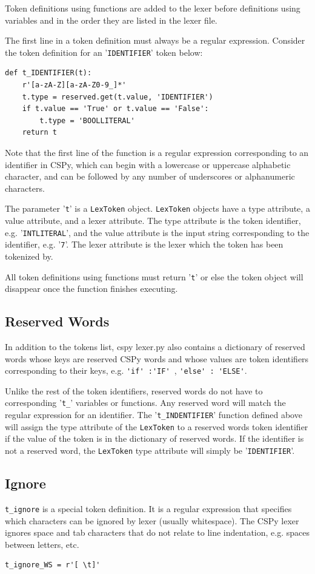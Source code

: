 \documentclass{article}
\begin{document}
Token definitions using functions are added to the lexer before definitions using variables and in the order they are listed in the lexer file. 

The first line in a token definition must always be a regular expression. Consider the token definition for an '\verb|IDENTIFIER|' token below:
\begin{verbatim}
def t_IDENTIFIER(t):
    r'[a-zA-Z][a-zA-Z0-9_]*'
    t.type = reserved.get(t.value, 'IDENTIFIER')
    if t.value == 'True' or t.value == 'False':
        t.type = 'BOOLLITERAL'
    return t
\end{verbatim}
Note that the first line of the function is a regular expression corresponding to an identifier in CSPy, which can begin with a lowercase or uppercase alphabetic character, and can be followed by any number of underscores or alphanumeric characters. 

The parameter '\verb|t|' is a \verb|LexToken| object. \verb|LexToken| objects have a type attribute, a value attribute, and a lexer attribute. The type attribute is the token identifier, e.g. '\verb|INTLITERAL|', and the value attribute is the input string corresponding to the identifier, e.g. '\verb|7|'. The lexer attribute is the lexer which the token has been tokenized by. 

All token definitions using functions must return '\verb|t|' or else the token object will disappear once the function finishes executing.

\subsection{Reserved Words}
In addition to the tokens list, cspy lexer.py also contains a dictionary of reserved words whose keys are reserved CSPy words and whose values are token identifiers corresponding to their keys, e.g. \verb|'if' :'IF' |, \verb|'else' : 'ELSE'|.

Unlike the rest of the token identifiers, reserved words do not have to corresponding '\verb|t_|' variables or functions. Any reserved word will match the regular expression for an identifier. The '\verb|t_INDENTIFIER|' function defined above will assign the type attribute of the \verb|LexToken| to a reserved words token identifier if the value of the token is in the dictionary of reserved words. If the identifier is not a reserved word, the \verb|LexToken| type attribute will simply be '\verb|IDENTIFIER|'.

\subsection{Ignore}
\verb|t_ignore| is a special token definition. It is a regular expression that specifies which characters can be ignored by lexer (usually whitespace). The CSPy lexer ignores space and tab characters that do not relate to line indentation, e.g. spaces between letters, etc.
\begin{verbatim}
t_ignore_WS = r'[ \t]'
\end{verbatim}
\end{document}
